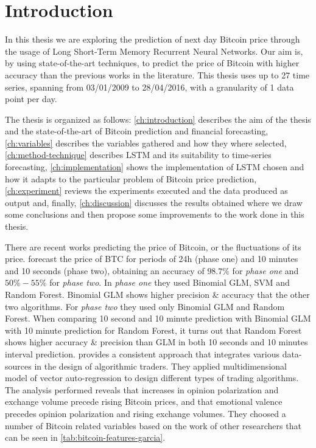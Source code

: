 
\chapter{Introduction} %

\label{ch:introduction}

In this thesis we are exploring the prediction of next day Bitcoin
price through the usage of Long Short-Term Memory Recurrent Neural
Networks. Our aim is, by using state-of-the-art techniques, to predict
the price of Bitcoin with higher accuracy than the previous works in
the literature. This thesis uses up to 27 time series, spanning from
03/01/2009 to 28/04/2016, with a granularity of 1 data point per day.

The thesis is organized as follows: \autoref{ch:introduction}
describes the aim of the thesis and the state-of-the-art of Bitcoin
prediction and financial forecasting, \autoref{ch:variables} describes
the variables gathered and how they where selected,
\autoref{ch:method-technique} describes LSTM and its suitability to
time-series forecasting, \autoref{ch:implementation} shows the
implementation of LSTM chosen and how it adapts to the particular
problem of Bitcoin price prediction, \autoref{ch:experiment} reviews
the experiments executed and the data produced as output and, finally,
\autoref{ch:discussion} discusses the results obtained where we draw
some conclusions and then propose some improvements to the work done
in this thesis.

There are recent works predicting the price of Bitcoin, or the
fluctuations of its price. \cite{madan_automated_2014} forecast the
price of BTC for periods of 24h (phase one) and 10 minutes and 10
seconds (phase two), obtaining an accuracy of $98.7\%$ for
\textit{phase one} and $50\% - 55\%$ for \textit{phase two}. In
\textit{phase one} they used Binomial GLM, SVM and Random Forest.
Binomial GLM shows higher precision \& accuracy that the other two
algorithms. For \textit{phase two} they used only Binomial GLM and
Random Forest. When comparing 10 second and 10 minute prediction with
Binomial GLM with 10 minute prediction for Random Forest, it turns out
that Random Forest shows higher accuracy \& precision than GLM in both
10 seconds and 10 minutes interval prediction.
\cite{garcia_social_2015} provides a consistent approach that
integrates various data-sources in the design of algorithmic traders.
They applied multidimensional model of vector auto-regression to
design different types of trading algorithms. The analysis performed
reveals that increases in opinion polarization and exchange volume
precede rising Bitcoin prices, and that emotional valence precedes
opinion polarization and rising exchange volumes. They choosed a
number of Bitcoin related variables based on the work of other
researchers that can be seen in \autoref{tab:bitcoin-features-garcia}.

